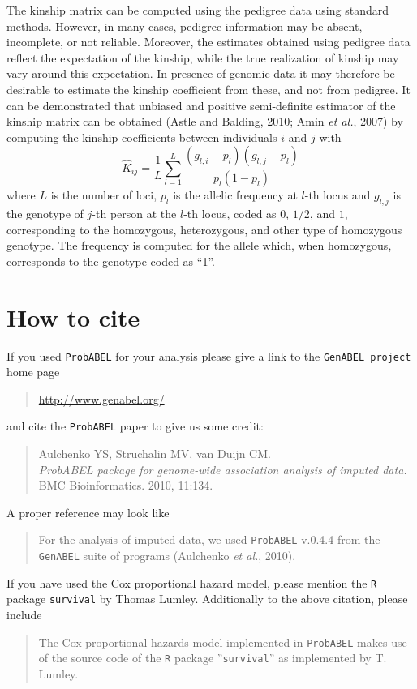 \documentclass[12pt,a4paper]{article}
\newcommand{\PA}{\texttt{ProbABEL}}
\begin{document}
The kinship matrix can be computed using the pedigree data using standard methods.
However, in many cases, pedigree information may be absent, incomplete, or not
reliable. Moreover, the estimates obtained using pedigree data reflect the
expectation of the kinship, while the true realization of kinship may vary
around this expectation. In presence of genomic data it may therefore be
desirable to estimate the kinship coefficient from these, and not from pedigree.
It can be demonstrated that unbiased and positive semi-definite estimator
of the kinship matrix can be obtained (Astle and Balding, 2010; Amin \emph{et al.}, 2007)
by computing the kinship coefficients between individuals $i$ and $j$ with
$$
\hat{K}_{ij} = \frac{1}{L} \sum_{l=1}^L \frac{ (g_{l,i} - p_l) (g_{l,j} - p_l) }{ p_l (1-p_l) }
$$
where $L$ is the number of loci, $p_l$ is the allelic frequency at $l$-th locus
and $g_{l,j}$ is the genotype of $j$-th person at the $l$-th locus, coded
as $0$, $1/2$, and $1$, corresponding to the homozygous, heterozygous, and
other type of homozygous genotype. The frequency is computed for the allele
which, when homozygous, corresponds to the genotype coded as ``1''.


\section{How to cite}

If you used \PA{} for your analysis please give a link to the
\texttt{GenABEL project} home page
\begin{quote}
\url{http://www.genabel.org/}
\end{quote}
and cite the \PA{} paper to give us some credit:
\begin{quote}
Aulchenko YS, Struchalin MV, van Duijn CM.\\
\emph{ProbABEL package for genome-wide association analysis of imputed data.}\\
BMC Bioinformatics. 2010, 11:134.
\end{quote}
A proper reference may look like
\begin{quote}
For the analysis of imputed data, we used \PA{} v.0.4.4
from the \texttt{GenABEL} suite of programs (Aulchenko \emph{et al.}, 2010).
\end{quote}

If you have used the Cox proportional hazard model, please mention the
\texttt{R} package \texttt{survival} by Thomas Lumley. Additionally
to the above citation, please include
\begin{quote}
The Cox proportional hazards model implemented in \PA{}
makes use of the source code of the \texttt{R} package ''\texttt{survival}''
as implemented by T. Lumley.
\end{quote}
\end{document}
